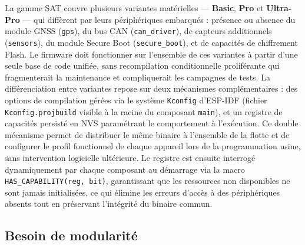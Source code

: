 La gamme SAT couvre plusieurs variantes matérielles — \textbf{Basic},
\textbf{Pro} et \textbf{Ultra-Pro} — qui diffèrent par leurs
périphériques embarqués : présence ou absence du module GNSS
(\texttt{gps}), du bus CAN (\texttt{can\_driver}), de capteurs
additionnels (\texttt{sensors}), du module Secure Boot
(\texttt{secure\_boot}), et de capacités de chiffrement Flash. Le
firmware doit fonctionner sur l'ensemble de ces variantes à partir
d'une seule base de code unifiée, sans recompilation conditionnelle
proliférante qui fragmenterait la maintenance et compliquerait les
campagnes de tests. La différenciation entre variantes repose sur
deux mécanismes complémentaires : des options de compilation gérées
via le système \texttt{Kconfig} d'ESP-IDF (fichier
\texttt{Kconfig.projbuild} visible à la racine du composant
\texttt{main}), et un registre de capacités persisté en NVS
paramétrant le comportement à l'exécution. Ce double mécanisme
permet de distribuer le même binaire à l'ensemble de la flotte et
de configurer le profil fonctionnel de chaque appareil lors de
la programmation usine, sans intervention logicielle ultérieure.
Le registre est ensuite interrogé dynamiquement par chaque
composant au démarrage via la macro \texttt{HAS\_CAPABILITY(reg, bit)},
garantissant que les ressources non disponibles ne sont jamais
initialisées, ce qui élimine les erreurs d'accès à des périphériques
absents tout en préservant l'intégrité du binaire commun.

\subsection{Besoin de modularité}
\label{subsec:besoin_mod}

